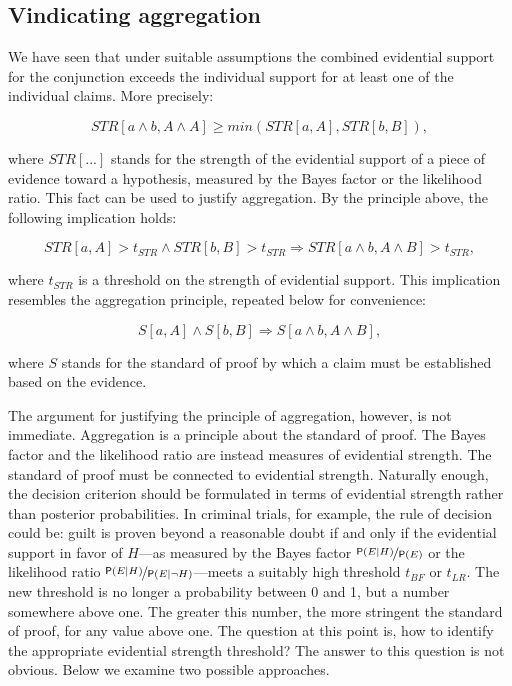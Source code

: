 \documentclass[
  10pt,
  dvipsnames,enabledeprecatedfontcommands]{scrartcl}
\newcommand{\n}{\neg}
\newcommand{\pr}[1]{\ensuremath{\mathsf{P}(#1)}}
\begin{document}
\hypertarget{vindicating-aggregation}{%
\subsection{Vindicating aggregation}\label{vindicating-aggregation}}

We have seen that under suitable assumptions the combined evidential
support for the conjunction exceeds the individual support for at least
one of the individual claims. More precisely:

\[STR[a \wedge b, A\wedge A] \geq min(STR[a, A], STR[b, B]),\]

\noindent where \(STR[...]\) stands for the strength of the evidential
support of a piece of evidence toward a hypothesis, measured by the
Bayes factor or the likelihood ratio. This fact can be used to justify
aggregation. By the principle above, the following implication holds:

\[STR[a, A]>t_{STR} \wedge STR[b, B]>t_{STR} \Rightarrow  STR[a \wedge b, A\wedge B]>t_{STR},\]

\noindent where \(t_{STR}\) is a threshold on the strength of evidential
support. This implication resembles the aggregation principle, repeated
below for convenience:

\[S[a, A] \wedge S[b, B] \Rightarrow  S[a \wedge b, A\wedge B],\]

\noindent  where \(S\) stands for the standard of proof by which a claim
must be established based on the evidence.

The argument for justifying the principle of aggregation, however, is
not immediate. Aggregation is a principle about the standard of proof.
The Bayes factor and the likelihood ratio are instead measures of
evidential strength. The standard of proof must be connected to
evidential strength. Naturally enough, the decision criterion should be
formulated in terms of evidential strength rather than posterior
probabilities. In criminal trials, for example, the rule of decision
could be: guilt is proven beyond a reasonable doubt if and only if the
evidential support in favor of \(H\)---as measured by the Bayes factor
\(\nicefrac{\pr{E \vert H}}{\pr{E}}\) or the likelihood ratio
\(\nicefrac{\pr{E\vert H}}{\pr{E \vert \n H}}\)---meets a suitably high
threshold \(t_{BF}\) or \(t_{LR}\). The new threshold is no longer a
probability between 0 and 1, but a number somewhere above one. The
greater this number, the more stringent the standard of proof, for any
value above one. The question at this point is, how to identify the
appropriate evidential strength threshold? The answer to this question
is not obvious. Below we examine two possible approaches.
\end{document}
